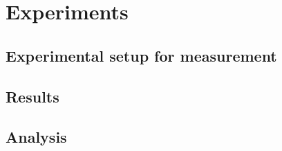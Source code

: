 \documentclass[../report.tex]{subfiles}
\begin{document}
	
\chapter{Experiments}
	\section{Experimental setup for measurement}
	
	\section{Results}
	
	\section{Analysis}
	
\end{document}
